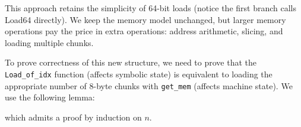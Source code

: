 \vspace{-5ex}

This approach retains the simplicity of 64-bit loads (notice the first branch calls Load64 directly).
We keep the memory model unchanged, but larger memory operations pay the price in extra operations: address arithmetic, slicing, and loading multiple chunks.

To prove correctness of this new structure, we need to prove that the \texttt{Load_of_idx} function (affects symbolic state) is equivalent to loading the appropriate number of 8-byte chunks with \texttt{get_mem} (affects machine state).
We use the following lemma:


\noindent which admits a proof by induction on $n$.



